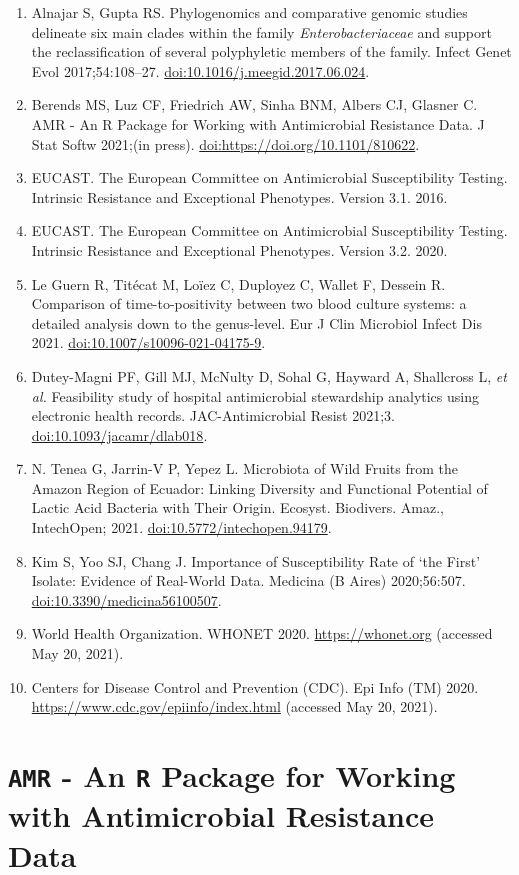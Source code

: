 \documentclass[
]{book}
\begin{document}
\begin{enumerate}
\item
  Alnajar S, Gupta RS. Phylogenomics and comparative genomic studies delineate six main clades within the family \emph{Enterobacteriaceae} and support the reclassification of several polyphyletic members of the family. Infect Genet Evol 2017;54:108--27. \url{doi:10.1016/j.meegid.2017.06.024}.
\item
  Berends MS, Luz CF, Friedrich AW, Sinha BNM, Albers CJ, Glasner C. AMR - An R Package for Working with Antimicrobial Resistance Data. J Stat Softw 2021;(in press). \url{doi:https://doi.org/10.1101/810622}.
\item
  EUCAST. The European Committee on Antimicrobial Susceptibility Testing. Intrinsic Resistance and Exceptional Phenotypes. Version 3.1. 2016.
\item
  EUCAST. The European Committee on Antimicrobial Susceptibility Testing. Intrinsic Resistance and Exceptional Phenotypes. Version 3.2. 2020.
\item
  Le Guern R, Titécat M, Loïez C, Duployez C, Wallet F, Dessein R. Comparison of time-to-positivity between two blood culture systems: a detailed analysis down to the genus-level. Eur J Clin Microbiol Infect Dis 2021. \url{doi:10.1007/s10096-021-04175-9}.
\item
  Dutey-Magni PF, Gill MJ, McNulty D, Sohal G, Hayward A, Shallcross L, \emph{et al.} Feasibility study of hospital antimicrobial stewardship analytics using electronic health records. JAC-Antimicrobial Resist 2021;3. \url{doi:10.1093/jacamr/dlab018}.
\item
  N. Tenea G, Jarrin-V P, Yepez L. Microbiota of Wild Fruits from the Amazon Region of Ecuador: Linking Diversity and Functional Potential of Lactic Acid Bacteria with Their Origin. Ecosyst. Biodivers. Amaz., IntechOpen; 2021. \url{doi:10.5772/intechopen.94179}.
\item
  Kim S, Yoo SJ, Chang J. Importance of Susceptibility Rate of `the First' Isolate: Evidence of Real-World Data. Medicina (B Aires) 2020;56:507. \url{doi:10.3390/medicina56100507}.
\item
  World Health Organization. WHONET 2020. \url{https://whonet.org} (accessed May 20, 2021).
\item
  Centers for Disease Control and Prevention (CDC). Epi Info (TM) 2020. \url{https://www.cdc.gov/epiinfo/index.html} (accessed May 20, 2021).
\end{enumerate}

\hypertarget{ch04-amr-r-package}{%
\chapter{\texorpdfstring{\texttt{AMR} - An \texttt{R} Package for Working with Antimicrobial Resistance Data}{AMR - An R Package for Working with Antimicrobial Resistance Data}}\label{ch04-amr-r-package}}
\end{document}
